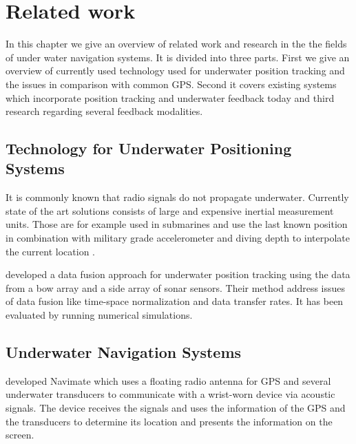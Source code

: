 %

\chapter{Related work}
\label{relatedwork}
In this chapter we give an overview of related work and research in the the fields of under water navigation systems. 
It is divided into three parts.
First we give an overview of currently used technology used for underwater position tracking and the issues in comparison with common GPS.
Second it covers existing systems which incorporate position tracking and underwater feedback today and third research regarding several feedback modalities. 

\section{Technology for Underwater Positioning Systems}

It is commonly known that radio signals do not propagate underwater.
Currently state of the art solutions consists of large and expensive inertial measurement units. 
Those are for example used in submarines and use the last known position in combination with military grade accelerometer and diving depth to interpolate the current location \citep{meyer}.

\cite{li} developed a data fusion approach for underwater position tracking using the data from a bow array and a side array of sonar sensors.
Their method address issues of data fusion like time-space normalization and data transfer rates.
It has been evaluated by running numerical simulations.

\section{Underwater Navigation Systems}

\cite{navimate} developed Navimate which uses a floating radio antenna for GPS and several underwater transducers to communicate with a wrist-worn device via acoustic signals. 
The device receives the signals and uses the information of the GPS and the transducers to determine its location and presents the information on the screen. 

